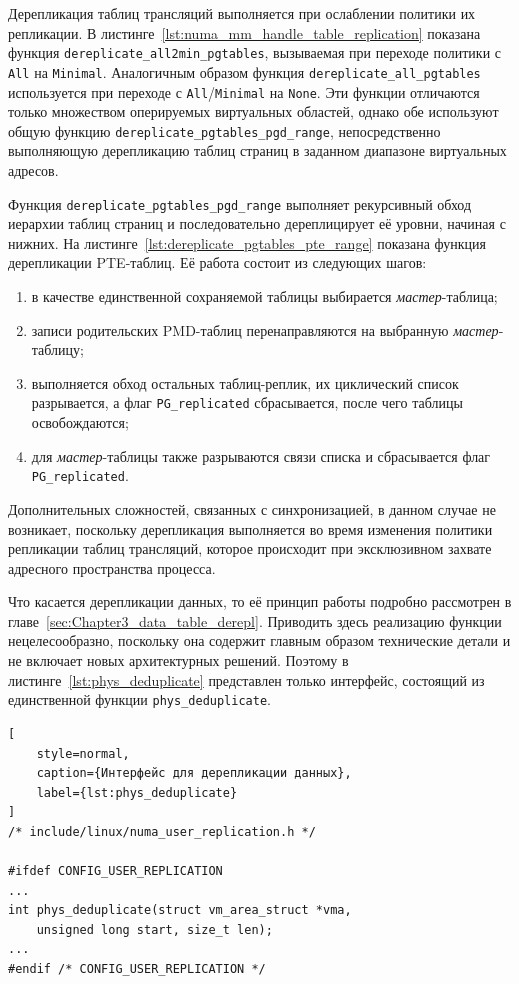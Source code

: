 Дерепликация таблиц трансляций выполняется при ослаблении политики их репликации. В листинге~\ref{lst:numa_mm_handle_table_replication} показана функция \texttt{dereplicate\_all2min\_pgtables}, вызываемая при переходе политики с \texttt{All} на \texttt{Minimal}. Аналогичным образом функция \texttt{dereplicate\_all\_pgtables} используется при переходе с \texttt{All}/\texttt{Minimal} на \texttt{None}. Эти функции отличаются только множеством оперируемых виртуальных областей, однако обе используют общую функцию \texttt{dereplicate\_pgtables\_pgd\_range}, непосредственно выполняющую дерепликацию таблиц страниц в заданном диапазоне виртуальных адресов.

Функция \texttt{dereplicate\_pgtables\_pgd\_range} выполняет рекурсивный обход иерархии таблиц страниц и последовательно дереплицирует её уровни, начиная с нижних. На листинге~\ref{lst:dereplicate_pgtables_pte_range} показана функция дерепликации PTE-таблиц. Её работа состоит из следующих шагов: 
\begin{enumerate}
	\item в качестве единственной сохраняемой таблицы выбирается \textit{мастер}-таблица;
	\item записи родительских PMD-таблиц перенаправляются на выбранную \textit{мастер}-таблицу;
	\item выполняется обход остальных таблиц-реплик, их циклический список разрывается, а флаг \texttt{PG\_replicated} сбрасывается, после чего таблицы освобождаются;
	\item для \textit{мастер}-таблицы также разрываются связи списка и сбрасывается флаг \texttt{PG\_replicated}.
\end{enumerate}

Дополнительных сложностей, связанных с синхронизацией, в данном случае не возникает, поскольку дерепликация выполняется во время изменения политики репликации таблиц трансляций, которое происходит при эксклюзивном захвате адресного пространства процесса.

Что касается дерепликации данных, то её принцип работы подробно рассмотрен в главе~\ref{sec:Chapter3_data_table_derepl}. Приводить здесь реализацию функции нецелесообразно, поскольку она содержит главным образом технические детали и не включает новых архитектурных решений. Поэтому в листинге~\ref{lst:phys_deduplicate} представлен только интерфейс, состоящий из единственной функции \texttt{phys\_deduplicate}.

\begin{lstlisting}[
	style=normal,
	caption={Интерфейс для дерепликации данных},
	label={lst:phys_deduplicate}
]
/* include/linux/numa_user_replication.h */

#ifdef CONFIG_USER_REPLICATION
...
int phys_deduplicate(struct vm_area_struct *vma,
	unsigned long start, size_t len);
...
#endif /* CONFIG_USER_REPLICATION */
\end{lstlisting}

